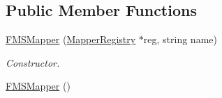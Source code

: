 \subsection*{Public Member Functions}
\begin{DoxyCompactItemize}
\item 
\hyperlink{classFMSMapper_a2e076abc50256b19b6e7a082deae0e6c}{FMSMapper} (\hyperlink{classMapperRegistry}{MapperRegistry} $\ast$reg, string name)
\begin{DoxyCompactList}\small\item\em Constructor. \item\end{DoxyCompactList}\item 
\hypertarget{classFMSMapper_afbfc063a1ec1b5959497a1d5e094e0ab}{
\hyperlink{classFMSMapper_afbfc063a1ec1b5959497a1d5e094e0ab}{FMSMapper} ()}
\label{classFMSMapper_afbfc063a1ec1b5959497a1d5e094e0ab}


\end{DoxyCompactItemize}
